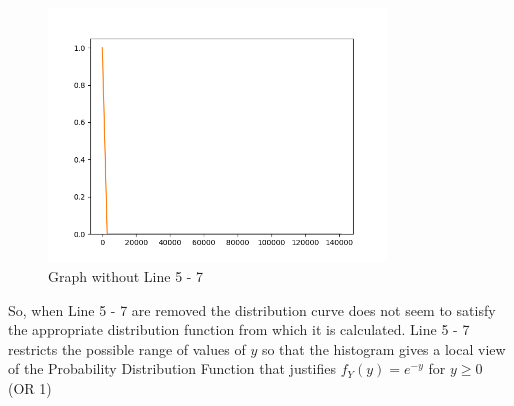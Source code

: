 \documentclass[answers]{exam}
\begin{document}
\begin{framed}
\begin{figure}[H]
    \includegraphics[width= 0.8\textwidth]{Q2.2_withoutLine5-7.PNG}
    \caption{Graph without Line 5 - 7}
\end{figure}

So, when Line 5 - 7 are removed the distribution curve does not seem to satisfy the appropriate distribution function from which it is calculated. Line 5 - 7 restricts the possible range of values of $y$ so that the histogram gives a local view of the Probability Distribution Function that justifies $f_Y(y) = e^{-y}$ for $y \geq 0$ (OR 1) 
\end{framed}

\end{document}
